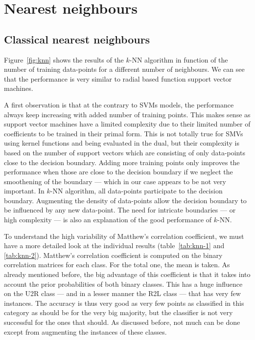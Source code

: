 \section{Nearest neighbours}
\subsection{Classical nearest neighbours}
Figure~\ref{fig:knn} shows the results of the $k$-NN algorithm in function of the number of training data-points for a different number of neighbours. We can see that the performance is very similar to radial based function support vector machines.

A first observation is that at the contrary to SVMs models, the performance always keep increasing with added number of training points. This makes sense as support vector machines have a limited complexity due to their limited number of coefficients to be trained in their primal form. This is not totally true for SMVs using kernel functions and being evaluated in the dual, but their complexity is based on the number of support vectors which are consisting of only data-points close to the decision boundary. Adding more training points only improves the performance when those are close to the decision boundary if we neglect the smoothening of the boundary --- which in our case appears to be not very important. In $k$-NN algorithm, all data-points participate to the decision boundary. Augmenting the density of data-points allow the decision boundary to be influenced by any new data-point. The need for intricate boundaries --- or high complexity --- is also an explanation of the good performance of $k$-NN.

To understand the high variability of Matthew's correlation coefficient, we must have a more detailed look at the individual results (table~\ref{tab:knn-1} and \ref{tab:knn-2}). Matthew's correlation coefficient is computed on the binary correlation matrices for each class. For the total one, the mean is taken. As already mentioned before, the big advantage of this coefficient is that it takes into account the prior probabilities of both binary classes. This has a huge influence on the U2R class --- and in a lesser manner the R2L class --- that has very few instances. The accuracy is thus very good as very few points as classified in this category as should be for the very big majority, but the classifier is not very successful for the ones that should. As discussed before, not much can be done except from augmenting the instances of these classes.

